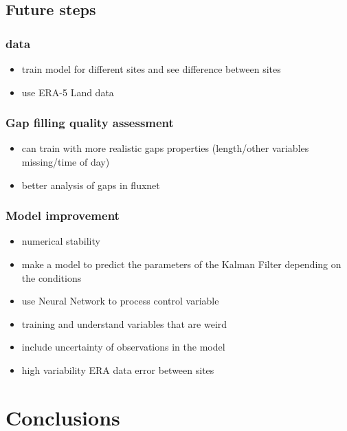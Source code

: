 \documentclass{article}
\let\Oldsection\section
\renewcommand{\section}{\FloatBarrier\Oldsection}
\let\Oldsubsection\subsection
\renewcommand{\subsection}{\FloatBarrier\Oldsubsection}
\begin{document}
\subsection{Future steps}

\subsubsection{data}
\begin{itemize}
    \item train model for different sites and see difference between sites
    \item use ERA-5 Land data
\end{itemize}

\subsubsection{Gap filling quality assessment}

\begin{itemize}
    \item can train with more realistic gaps properties (length/other variables missing/time of day)
    \item better analysis of gaps in fluxnet
\end{itemize}

\subsubsection{Model improvement}

\begin{itemize}
\item numerical stability
\item make a model to predict the parameters of the Kalman Filter depending on the conditions
\item use Neural Network to process control variable
\item training and understand variables that are weird
\item include uncertainty of observations in the model
\item high variability ERA data error between sites
\end{itemize}



\section{Conclusions}
\end{document}
